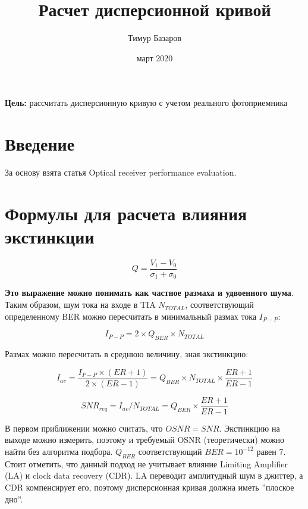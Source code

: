 \documentclass{article}
\title{Расчет дисперсионной кривой}
\author{Тимур Базаров}
\date{март 2020}
\begin{document}
\maketitle

\textbf{Цель:} рассчитать дисперсионную кривую с учетом реального фотоприемника


\section{Введение}
За основу взята статья Optical receiver performance evaluation.

\section{Формулы для расчета влияния экстинкции}

\begin{equation}
    Q=\frac{V_1-V_0}{\sigma_1+\sigma_0}
\end{equation}

\textbf{Это выражение можно понимать как частное размаха и удвоенного шума}.
Таким образом, шум тока на входе в TIA $N_{TOTAL}$, соответствующий определенному BER можно пересчитать в минимальный размах тока $I_{P-P}$:

\begin{equation}
    I_{P-P}=2\times Q_{BER}\times N_{TOTAL}
\end{equation}

Размах можно пересчитать в среднюю величину, зная экстинкцию:

\begin{equation}
    I_{av}=\frac{I_{P-P}\times(ER+1)}{2\times(ER-1)}=Q_{BER}\times N_{TOTAL}\times\frac{ER+1}{ER-1}
\end{equation}

\begin{equation}
    SNR_{req}=I_{av}/N_{TOTAL}=Q_{BER}\times\frac{ER+1}{ER-1}
    \label{eq:OSNRreq}
\end{equation}

В первом приближении можно считать, что $OSNR=SNR$. Экстинкцию на выходе можно измерить, поэтому и требуемый OSNR (теоретически) можно найти без алгоритма подбора. $Q_{BER}$ соответствующий $BER=10^{-12}$ равен 7. 
Стоит отметить, что данный подход не учитывает влияние Limiting Amplifier (LA) и clock data recovery (CDR). LA переводит амплитудный шум в джиттер, а CDR компенсирует его, поэтому дисперсионная кривая должна иметь ''плоское дно''.
\end{document}
